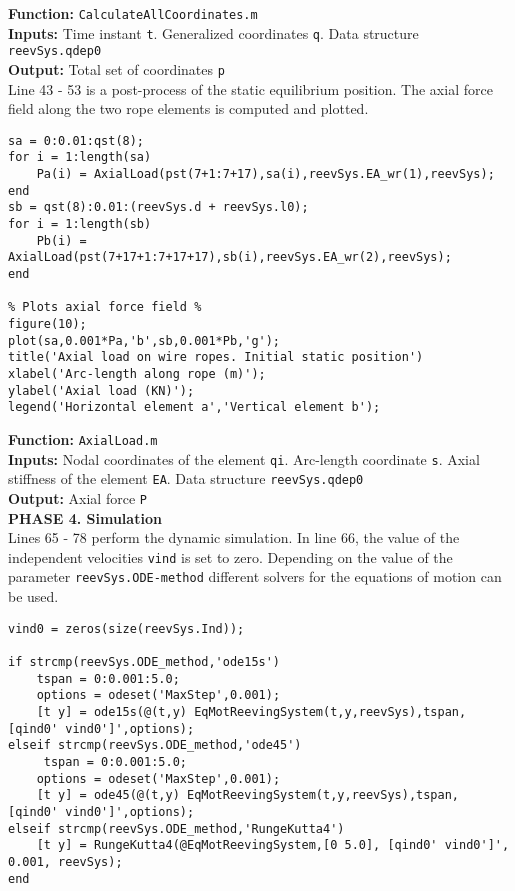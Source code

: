 \setlength{\parindent}{0cm}
\textbf{Function:} \texttt{CalculateAllCoordinates.m} \\
\textbf{Inputs:} Time instant \texttt{t}. Generalized coordinates \texttt{q}. Data structure \texttt{reevSys.qdep0} \\
\textbf{Output:} Total set of coordinates \texttt{p} \\

Line 43 - 53 is a post-process of the static equilibrium position. The axial force field along the two rope elements is computed and plotted.

{\begin{tcolorbox}\begin{lstlisting}[style=Matlab-editor]
% Calculation of axial force field along rope %
sa = 0:0.01:qst(8);
for i = 1:length(sa)
    Pa(i) = AxialLoad(pst(7+1:7+17),sa(i),reevSys.EA_wr(1),reevSys);
end
sb = qst(8):0.01:(reevSys.d + reevSys.l0);
for i = 1:length(sb)
    Pb(i) = AxialLoad(pst(7+17+1:7+17+17),sb(i),reevSys.EA_wr(2),reevSys);
end

% Plots axial force field %
figure(10);
plot(sa,0.001*Pa,'b',sb,0.001*Pb,'g');
title('Axial load on wire ropes. Initial static position')
xlabel('Arc-length along rope (m)');
ylabel('Axial load (KN)');
legend('Horizontal element a','Vertical element b');
\end{lstlisting}\end{tcolorbox}}


\setlength{\parindent}{0cm}
\textbf{Function:} \texttt{AxialLoad.m} \\
\textbf{Inputs:} Nodal coordinates of the element \texttt{qi}. Arc-length coordinate \texttt{s}. Axial stiffness of the element \texttt{EA}. Data structure \texttt{reevSys.qdep0} \\
\textbf{Output:} Axial force \texttt{P} \\

\textbf{PHASE 4. Simulation} \\

Lines 65 - 78 perform the dynamic simulation. In line 66, the value of the independent velocities \texttt{vind} is set to zero. Depending on the value of the parameter \texttt{reevSys.ODE-method} different solvers for the equations of motion can be used.

{\begin{tcolorbox}\begin{lstlisting}[style=Matlab-editor]
% Initial value of independent velocities %
vind0 = zeros(size(reevSys.Ind));

if strcmp(reevSys.ODE_method,'ode15s')
    tspan = 0:0.001:5.0;
    options = odeset('MaxStep',0.001);
    [t y] = ode15s(@(t,y) EqMotReevingSystem(t,y,reevSys),tspan, [qind0' vind0']',options);
elseif strcmp(reevSys.ODE_method,'ode45')
     tspan = 0:0.001:5.0;
    options = odeset('MaxStep',0.001);
    [t y] = ode45(@(t,y) EqMotReevingSystem(t,y,reevSys),tspan, [qind0' vind0']',options);
elseif strcmp(reevSys.ODE_method,'RungeKutta4')
    [t y] = RungeKutta4(@EqMotReevingSystem,[0 5.0], [qind0' vind0']', 0.001, reevSys);
end
\end{lstlisting}\end{tcolorbox}}


